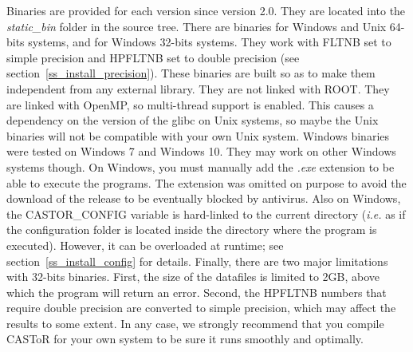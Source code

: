 \documentclass[a4paper, 11pt]{article}
\begin{document}
Binaries are provided for each version since version 2.0.
They are located into the \textit{static\_bin} folder in the source tree.
There are binaries for Windows and Unix 64-bits systems, and for Windows 32-bits systems.
They work with FLTNB set to simple precision and HPFLTNB set to double precision (see section~\ref{ss_install_precision}).
These binaries are built so as to make them independent from any external library.
They are not linked with ROOT.
They are linked with OpenMP, so multi-thread support is enabled.
This causes a dependency on the version of the glibc on Unix systems, so maybe the Unix binaries will not be compatible with your own Unix system.
Windows binaries were tested on Windows 7 and Windows 10.
They may work on other Windows systems though.
On Windows, you must manually add the \textit{.exe} extension to be able to execute the programs.
The extension was omitted on purpose to avoid the download of the release to be eventually blocked by antivirus.
Also on Windows, the CASTOR\_CONFIG variable is hard-linked to the current directory (\textit{i.e.} as if the configuration folder is located inside the directory
where the program is executed).
However, it can be overloaded at runtime; see section~\ref{ss_install_config} for details.
Finally, there are two major limitations with 32-bits binaries.
First, the size of the datafiles is limited to 2GB, above which the program will return an error.
Second, the HPFLTNB numbers that require double precision are converted to simple precision, which may affect the results to some extent.
In any case, we strongly recommend that you compile CASToR for your own system to be sure it runs smoothly and optimally.

\newpage
\end{document}
